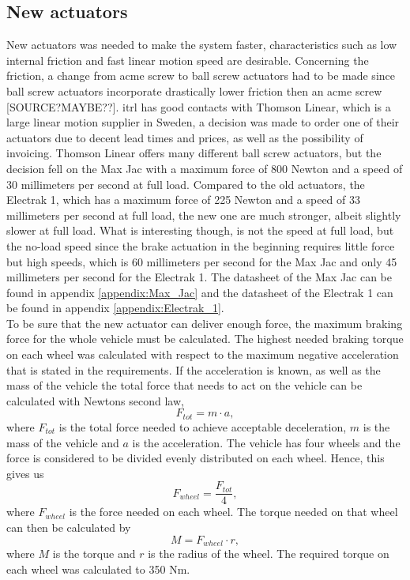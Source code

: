 \documentclass[a4paper,11pt]{kth-mag}
\begin{document}
\subsection{New actuators}
New actuators was needed to make the system faster, characteristics such as low internal friction and fast linear motion speed are desirable. Concerning the friction, a change from acme screw to ball screw actuators had to be made since ball screw actuators incorporate drastically lower friction then an acme screw [SOURCE?MAYBE??]. \gls{itrl} has good contacts with Thomson Linear, which is a large linear motion supplier in Sweden, a decision was made to order one of their actuators due to decent lead times and prices, as well as the possibility of invoicing. Thomson Linear offers many different ball screw actuators, but the decision fell on the Max Jac with a maximum force of 800 Newton and a speed of 30 millimeters per second at full load. Compared to the old actuators, the Electrak 1, which has a maximum force of 225 Newton and a speed of 33 millimeters per second at full load, the new one are much stronger, albeit slightly slower at full load. What is interesting though, is not the speed at full load, but the no-load speed since the brake actuation in the beginning requires little force but high speeds, which is 60 millimeters per second for the Max Jac and only 45 millimeters per second for the Electrak 1. The datasheet of the Max Jac can be found in appendix \ref{appendix:Max_Jac} and the datasheet of the Electrak 1 can be found in appendix \ref{appendix:Electrak_1}.\\

To be sure that the new actuator can deliver enough force, the maximum braking force for the whole vehicle must be calculated. The highest needed braking torque on each wheel was calculated with respect to the maximum negative acceleration that is stated in the requirements. If the acceleration is known, as well as the mass of the vehicle the total force that needs to act on the vehicle can be calculated with Newtons second law, 
\begin{equation}
F_{tot}=m\cdot a,
\end{equation}
where $F_{tot}$ is the total force needed to achieve acceptable deceleration, $m$ is the mass of the vehicle and $a$ is the acceleration. The vehicle has four wheels and the force is considered to be divided evenly distributed on each wheel. Hence, this gives us 
\begin{equation}
F_{wheel}=\frac{F_{tot}}{4},
\end{equation}
where $F_{wheel}$ is the force needed on each wheel. The torque needed on that wheel can then be calculated by 
\begin{equation}
M=F_{wheel}\cdot r,
\end{equation}
where $M$ is the torque and $r$ is the radius of the wheel. The required torque on each wheel was calculated to 350 Nm.\\
\end{document}
